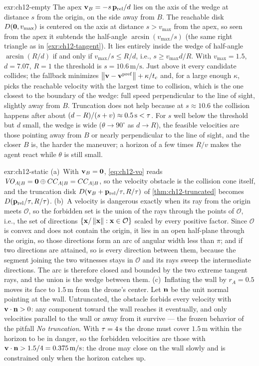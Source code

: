 \begin{solution}{exr:ch12-empty}
The apex $\mathbf{v}_B=-s\,\mathbf{p}_{\mathrm{rel}}/d$ lies on the axis of the wedge at distance $s$ from the origin, on the side away from $B$. The reachable disk $D(\mathbf{0},v_{\max})$ is centered on the axis at distance $s>v_{\max}$ from the apex, so seen from the apex it subtends the half-angle $\arcsin(v_{\max}/s)$ (the same right triangle as in \cref{exr:ch12-tangent}). It lies entirely inside the wedge of half-angle $\arcsin(R/d)$ if and only if $v_{\max}/s\le R/d$, i.e., $s\ge v_{\max}d/R$. With $v_{\max}=1.5$, $d=7.07$, $R=1$ the threshold is $s=10.6\,\mathrm{m/s}$. Just above it every candidate collides; the fallback minimizes $\left\lVert \mathbf{v}-\mathbf{v}^{\mathrm{pref}} \right\rVert+\kappa/t_c$ and, for a large enough $\kappa$, picks the reachable velocity with the largest time to collision, which is the one closest to the boundary of the wedge: full speed perpendicular to the line of sight, slightly away from $B$. Truncation does not help because at $s\approx10.6$ the collision happens after about $(d-R)/(s+v)\approx0.5\,\mathrm{s}<\tau$. For $s$ well below the threshold but $d$ small, the wedge is wide ($\theta\to90^\circ$ as $d\to R$), the feasible velocities are those pointing away from $B$ or nearly perpendicular to the line of sight, and the closer $B$ is, the harder the maneuver; a horizon of a few times $R/v$ makes the agent react while $\theta$ is still small.
\end{solution}
\begin{solution}{exr:ch12-static}
(a)~With $\mathbf{v}_B=\mathbf{0}$, \cref{eq:ch12-vo} reads
$\mathit{VO}_{A|B}=\mathbf{0}\oplus CC_{A|B}=CC_{A|B}$, so the velocity obstacle is the
collision cone itself, and the truncation disk
$D(\mathbf{v}_B+\mathbf{p}_{\mathrm{rel}}/\tau,R/\tau)$ of \cref{thm:ch12-truncated}
becomes $D(\mathbf{p}_{\mathrm{rel}}/\tau,R/\tau)$. (b)~A velocity is dangerous
exactly when its ray from the origin meets $\mathcal{O}$, so the forbidden set
is the union of the rays through the points of $\mathcal{O}$, i.e., the set of
directions $\left\{ \mathbf{x}/\left\lVert \mathbf{x} \right\rVert : \mathbf{x}\in\mathcal{O} \right\}$ scaled by
every positive factor. Since $\mathcal{O}$ is convex and does not contain the
origin, it lies in an open half-plane through the origin, so those directions
form an arc of angular width less than $\pi$; and if two directions are
attained, so is every direction between them, because the segment joining the
two witnesses stays in $\mathcal{O}$ and its rays sweep the intermediate
directions. The arc is therefore closed and bounded by the two extreme tangent
rays, and the union is the wedge between them. (c)~Inflating the wall by
$r_A=0.5$ moves its face to $1.5\,\mathrm{m}$ from the drone's center. Let
$\mathbf{n}$ be the unit normal pointing at the wall. Untruncated, the obstacle
forbids every velocity with $\mathbf{v}\cdot\mathbf{n}>0$: any component toward the
wall reaches it eventually, and only velocities parallel to the wall or away
from it survive --- the frozen behavior of the pitfall \emph{No truncation}.
With $\tau=4\,\mathrm{s}$ the drone must cover $1.5\,\mathrm{m}$ within the
horizon to be in danger, so the forbidden velocities are those with
$\mathbf{v}\cdot\mathbf{n}>1.5/4=0.375\,\mathrm{m/s}$: the drone may close on the wall
slowly and is constrained only when the horizon catches up.
\end{solution}
